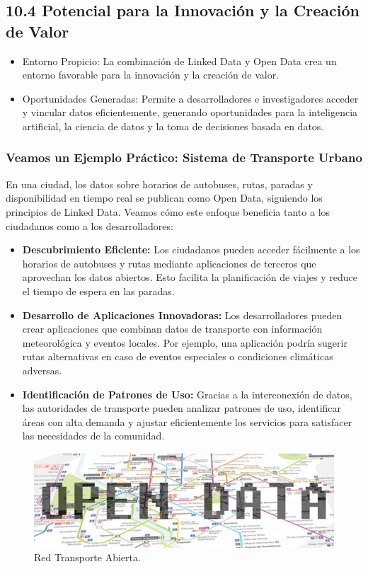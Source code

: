 \documentclass[11pt]{report}
\begin{document}
\subsection*{10.4 Potencial para la Innovación y la Creación de Valor}
\begin{itemize}
  \item Entorno Propicio: La combinación de Linked Data y Open Data crea un entorno favorable para la innovación y la creación de valor.
  \item Oportunidades Generadas: Permite a desarrolladores e investigadores acceder y vincular datos eficientemente, generando oportunidades para la inteligencia artificial, la ciencia de datos y la toma de decisiones basada en datos.
\end{itemize}
\subsubsection{Veamos un Ejemplo Práctico: Sistema de Transporte Urbano}

En una ciudad, los datos sobre horarios de autobuses, rutas, paradas y disponibilidad en tiempo real se publican como Open Data, siguiendo los principios de Linked Data. Veamos cómo este enfoque beneficia tanto a los ciudadanos como a los desarrolladores:

\begin{itemize}
    \item \textbf{Descubrimiento Eficiente:} Los ciudadanos pueden acceder fácilmente a los horarios de autobuses y rutas mediante aplicaciones de terceros que aprovechan los datos abiertos. Esto facilita la planificación de viajes y reduce el tiempo de espera en las paradas.
    
    \item \textbf{Desarrollo de Aplicaciones Innovadoras:} Los desarrolladores pueden crear aplicaciones que combinan datos de transporte con información meteorológica y eventos locales. Por ejemplo, una aplicación podría sugerir rutas alternativas en caso de eventos especiales o condiciones climáticas adversas.
    
    \item \textbf{Identificación de Patrones de Uso:} Gracias a la interconexión de datos, las autoridades de transporte pueden analizar patrones de uso, identificar áreas con alta demanda y ajustar eficientemente los servicios para satisfacer las necesidades de la comunidad.
\end{itemize}
\begin{figure}[H]
	\centering
	\includegraphics[scale=0.4]{../img/transport.jpg}
	\caption{Red Transporte Abierta.}
	\label{fig:opendata}
\end{figure}
\end{document}
